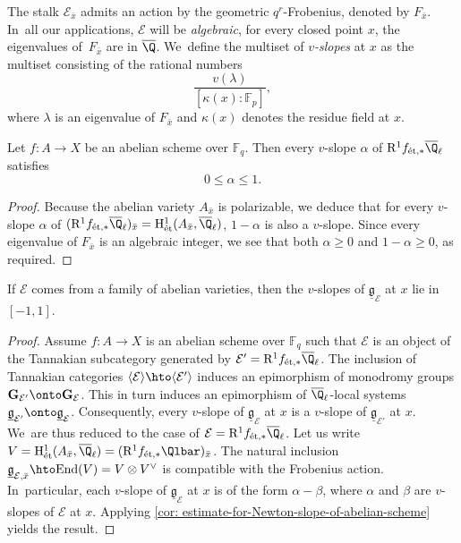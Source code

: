 The stalk $\mathcal{E}_{\bar x}$ admits an action by the geometric $q^r$-Frobenius, denoted by $F_{\bar x}$. In~all our applications, $\mathcal{E}$ will be \emph{algebraic}, \ie for every closed point $x$, the eigenvalues of~$F_{\bar x}$ are in $\overline{\Q}$. We~define the multiset of \emph{$v$-slopes} at $x$ as the multiset consisting of the rational numbers
\[
\frac{v(\lambda)}{[\kappa(x)\colon\mathbb{F}_p]},
\]
where $\lambda$ is an eigenvalue of $F_{\bar x}$ and $\kappa(x)$ denotes the residue field at $x$.

\begin{lem}\label{cor: estimate-for-Newton-slope-of-abelian-scheme}
Let $f\colon A\to X$ be an abelian scheme over $\mathbb{F}_q$. Then every $v$-slope $\alpha$ of $\mathrm{R}^1f_{\textnormal{ét},\ast}\overline{\Q}_\ell$ satisfies
\[
0\leq\alpha\leq 1.
\]
\end{lem}

\begin{proof}
Because the abelian variety $A_{\bar x}$ is polarizable, we deduce that for every $v$\nobreakdash-slope $\alpha$ of $(\mathrm{R}^1f_{\textnormal{ét},\ast}\overline{\Q}_\ell)_{\bar x}=\mathrm{H}^1_\textnormal{ét}(A_{\bar x},\overline{\Q}_\ell)$, $1-\alpha$ is also a $v$-slope. Since every eigenvalue of $F_{\bar x}$ is an algebraic integer, we see that both $\alpha\geq 0$ and $1-\alpha\geq 0$, as required.
\end{proof}

\begin{prop}\label{prop: criterion-crystalline}
If $\mathcal{E}$ comes from a family of abelian varieties, then the $v$-slopes of $\underline{\mathfrak{g}}_{\mathcal{E}}$ at $x$ lie in $[-1,1]$.
\end{prop}

\begin{proof}
Assume $f\colon A\to X$ is an abelian scheme over $\mathbb{F}_q$ such that $\mathcal{E}$ is an object of the Tannakian subcategory generated by $\mathcal{E}'=\mathrm{R}^1f_{\textnormal{ét},\ast}\overline{\Q}_\ell$. The inclusion of Tannakian categories $\langle\mathcal{E}\rangle\hto\langle\mathcal{E}'\rangle$ induces an epimorphism of monodromy groups $\mathbf{G}_\mathcal{E'}\onto \mathbf{G}_\mathcal{E}$. This in turn induces an epimorphism of $\overline{\Q}_\ell$-local systems $\underline{\mathfrak{g}}_\mathcal{E'}\onto \underline{\mathfrak{g}}_\mathcal{E}$. Consequently, every $v$-slope of $\underline{\mathfrak{g}}_{\mathcal{E}}$ at $x$ is a $v$-slope of $\underline{\mathfrak{g}}_{\mathcal{E'}}$ at $x$. We~are thus reduced to the case of $\mathcal{E}=\mathrm{R}^1f_{\textnormal{ét},\ast}\overline{\Q}_\ell$. Let us write $V=\mathrm{H}^1_\textnormal{ét}(A_{\bar x},\overline{\Q}_\ell)=(\mathrm{R}^1f_{\textnormal{ét},\ast}\Qlbar)_{\bar x}$. The natural inclusion $\underline{\mathfrak{g}}_{\mathcal{E},\bar x}\hto\mathrm{End}(V)=V\otimes V^\vee$ is compatible with the Frobenius action. In~particular, each $v$-slope of $\underline{\mathfrak{g}}_{\mathcal{E}}$ at $x$ is of the form $\alpha-\beta$, where $\alpha$ and $\beta$ are $v$-slopes of $\mathcal{E}$ at $x$. Applying \cref{cor: estimate-for-Newton-slope-of-abelian-scheme} yields the result.
\end{proof}

